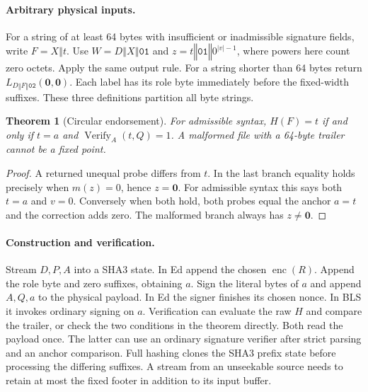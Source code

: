 \documentclass[10pt,twocolumn,letterpaper]{article}
\newtheorem{theorem}{Theorem}
\newcommand{\cat}{\mathbin\Vert}
\newcommand{\enc}{\operatorname{enc}}
\newcommand{\Ver}{\operatorname{Verify}}
\newcommand{\zeros}{\mathbf{0}}
\begin{document}
\paragraph{Arbitrary physical inputs.}
For a string of at least 64 bytes with insufficient or inadmissible signature fields, write $F=X\cat t$. Use $W=D\cat X\cat\mathtt{01}$ and $z=t\cat\mathtt{01}\cat 0^{|v|-1}$, where powers here count zero octets. Apply the same output rule. For a string shorter than 64 bytes return $L_{D\cat F\cat\mathtt{02}}(\zeros,\zeros)$. Each label has its role byte immediately before the fixed-width suffixes. These three definitions partition all byte strings.

\begin{theorem}[Circular endorsement]
For admissible syntax, $H(F)=t$ if and only if $t=a$ and $\Ver_A(t,Q)=1$. A malformed file with a 64-byte trailer cannot be a fixed point.
\end{theorem}
\begin{proof}
A returned unequal probe differs from $t$. In the last branch equality holds precisely when $m(z)=0$, hence $z=\zeros$. For admissible syntax this says both $t=a$ and $v=0$. Conversely when both hold, both probes equal the anchor $a=t$ and the correction adds zero. The malformed branch always has $z\ne\zeros$.
\end{proof}

\paragraph{Construction and verification.}
Stream $D,P,A$ into a SHA3 state. In Ed append the chosen $\enc(R)$. Append the role byte and zero suffixes, obtaining $a$. Sign the literal bytes of $a$ and append $A,Q,a$ to the physical payload. In Ed the signer finishes its chosen nonce. In BLS it invokes ordinary signing on $a$. Verification can evaluate the raw $H$ and compare the trailer, or check the two conditions in the theorem directly. Both read the payload once. The latter can use an ordinary signature verifier after strict parsing and an anchor comparison. Full hashing clones the SHA3 prefix state before processing the differing suffixes. A stream from an unseekable source needs to retain at most the fixed footer in addition to its input buffer.
\end{document}
